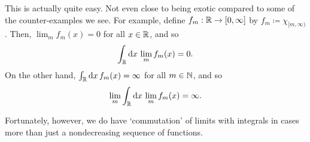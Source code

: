 \begin{exm}\label{MonotoneCounterexample}
This is actually quite easy.  Not even close to being exotic compared to some of the counter-examples we see.  For example, define $f_m:\mathbb{R} \rightarrow [0,\infty ]$ by $f_m\coloneqq \chi _{[m,\infty )}$.  Then, $\lim _mf_m(x)=0$ for all $x\in \mathbb{R}$, and so
\begin{equation}
\int _{\mathbb{R}}\mathop{}\!\mathrm{d} x\, \lim _mf_m(x)=0.
\end{equation}
On the other hand, $\int _{\mathbb{R}}\mathop{}\!\mathrm{d} x\, f_m(x)=\infty$ for all $m\in \mathbb{N}$, and so
\begin{equation}
\lim _m\int _{\mathbb{R}}\mathop{}\!\mathrm{d} x\, \lim _mf_m(x)=\infty .
\end{equation}
\end{exm}
Fortunately, however, we do have `commutation' of limits with integrals in cases more than just a nondecreasing sequence of functions.

